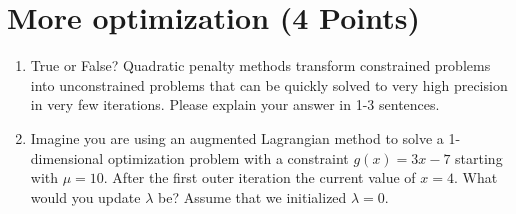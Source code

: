 \documentclass[]{article}
\begin{document}
\bigskip


\newpage

\section{More optimization (4 Points)}
\begin{tcolorbox}[left=14pt, arc=0pt, outer arc=0pt, colframe=blue!5, colback=blue!5]

\begin{enumerate}[label=(\alph*)]
    \item True or False? Quadratic penalty methods transform constrained problems into unconstrained problems that can be quickly solved to very high precision in very few iterations. Please explain your answer in 1-3 sentences.
    \item Imagine you are using an augmented Lagrangian method to solve a 1-dimensional optimization problem with a constraint $g(x) = 3x - 7$ starting with $\mu = 10$. After the first outer iteration the current value of $x = 4$. What would you update $\lambda$ be? Assume that we initialized $\lambda = 0$.
\end{enumerate}
\end{tcolorbox}
\bigskip

\end{document}
